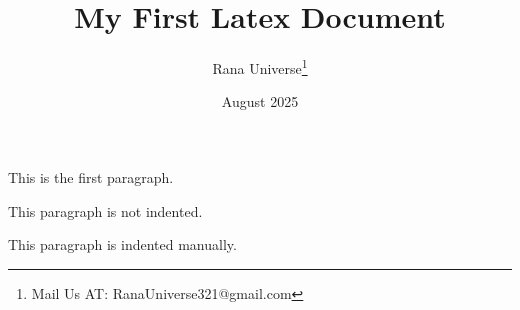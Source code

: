 \documentclass[12pt, letterpaper]{article}
\title{My First Latex Document}
\author{Rana Universe\thanks{Mail Us AT: RanaUniverse321@gmail.com}}
\date{August 2025}
\begin{document}
\maketitle


This is the first paragraph.

\noindent This paragraph is not indented.

\indent This paragraph is indented manually.




\end{document}
